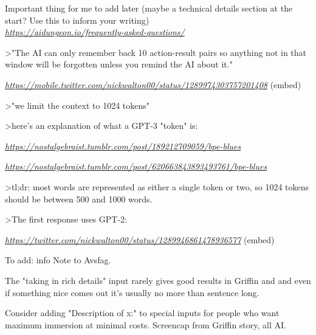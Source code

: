 \documentclass[Avsfag-main.tex]{subfiles}
\begin{document}
Important thing for me to add later (maybe a technical details section
at the start? Use this to inform your writing)\\

\href{https://aidungeon.io/frequently-asked-questions/}{\emph{https://aidungeon.io/frequently-asked-questions/}}

\textgreater"The AI can only remember back 10 action-result pairs so
anything not in that window will be forgotten unless you remind the AI
about it."

\href{https://mobile.twitter.com/nickwalton00/status/1289974303757201408}{\emph{https://mobile.twitter.com/nickwalton00/status/1289974303757201408}}
(embed)

\textgreater"we limit the context to 1024 tokens"

\textgreater here's an explanation of what a GPT-3 "token" is:

\href{https://nostalgebraist.tumblr.com/post/189212709059/bpe-blues}{\emph{https://nostalgebraist.tumblr.com/post/189212709059/bpe-blues}}

\href{https://nostalgebraist.tumblr.com/post/620663843893493761/bpe-blues}{\emph{https://nostalgebraist.tumblr.com/post/620663843893493761/bpe-blues}}

\textgreater tl;dr: most words are represented as either a single token
or two, so 1024 tokens should be between 500 and 1000 words.

\textgreater The first response uses GPT-2:

\href{https://twitter.com/nickwalton00/status/1289946861478936577}{\emph{https://twitter.com/nickwalton00/status/1289946861478936577}}
(embed)

To add: info Note to Avsfag.

The "taking in rich details" input rarely gives good results in Griffin
and and even if something nice comes out it's usually no more than
sentence long.

Consider adding "Description of x:" to special inputs for people who
want maximum immersion at minimal costs. Screencap from Griffin story,
all AI.
\end{document}
